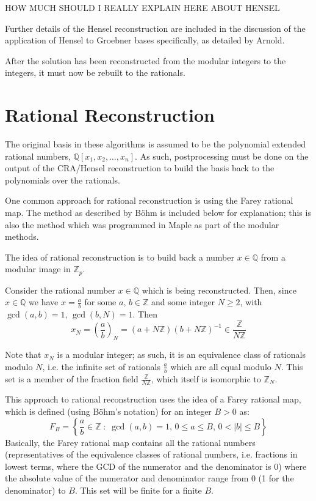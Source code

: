 \documentclass[letterpaper,12pt,titlepage,oneside,final]{book}
\begin{document}
HOW MUCH SHOULD I REALLY EXPLAIN HERE ABOUT HENSEL  

Further details of the Hensel reconstruction are included in the discussion of the application of Hensel to Groebner bases specifically, as detailed by Arnold.

After the solution has been reconstructed from the modular integers to the integers, it must now be rebuilt to the rationals.

\section{Rational Reconstruction}

The original basis in these algorithms is assumed to be the polynomial extended rational numbers, ${\mathbb{Q}[x_1, x_2, \ldots, x_n]}$.  As such, postprocessing must be done on the output of the CRA/Hensel reconstruction to build the basis back to the polynomials over the rationals.  

One common approach for rational reconstruction is using the Farey rational map.  The method as described by B\"ohm is included below for explanation; this is also the method which was programmed in Maple as part of the modular methods.

The idea of rational reconstruction is to build back a number ${x \in \mathbb{Q}}$ from a modular image in ${\mathbb{Z}_p}$. 

Consider the rational number ${x \in \mathbb{Q}}$ which is being reconstructed.  Then, since ${x \in \mathbb{Q}}$ we have ${x = \frac{a}{b}}$ for some ${a,\,b \in \mathbb{Z}}$ and some integer ${N \geq 2}$, with ${\gcd(a, b) = 1,\, \gcd(b, N) = 1}$.
Then
\begin{equation*}
  x_N = \left(\frac{a}{b}\right)_N = (a + N\mathbb{Z})(b + N\mathbb{Z})^{-1} \in \frac{\mathbb{Z}}{N\mathbb{Z}}
\end{equation*}   

Note that ${x_N}$ is a modular integer; as such, it is an equivalence class of rationals modulo ${N}$, i.e. the infinite set of rationals ${\frac{a}{b}}$ which are all equal modulo ${N}$.  This set is a member of the fraction field ${\frac{\mathbb{Z}}{N\mathbb{Z}}}$, which itself is isomorphic to ${\mathbb{Z}_N}$.

This approach to rational reconstruction uses the idea of a Farey rational map, which is defined (using B\"ohm's notation) for an integer ${B > 0}$ as:
\begin{equation*}
  F_B = \left\{\frac{a}{b} \in \mathbb{Z}\; : \; \gcd(a, b) = 1,\, 0 \leq a \leq B,\, 0 < |b| \leq B\right\}
\end{equation*}
Basically, the Farey rational map contains all the rational numbers (representatives of the equivalence classes of rational numbers, i.e. fractions in lowest terms, where the GCD of the numerator and the denominator is 0) where the absolute value of the numerator and denominator range from 0 (1 for the denominator) to ${B}$.  This set will be finite for a finite ${B}$.
\end{document}
